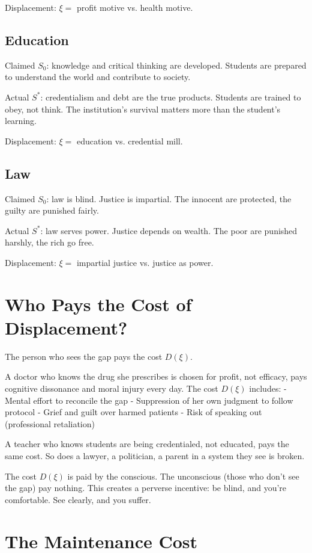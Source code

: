 \documentclass[12pt]{article}
\begin{document}
Displacement: $\xi = $ profit motive vs. health motive.

\subsection{Education}

Claimed $S_0$: knowledge and critical thinking are developed. Students are prepared to understand the world and contribute to society.

Actual $S^*$: credentialism and debt are the true products. Students are trained to obey, not think. The institution's survival matters more than the student's learning.

Displacement: $\xi = $ education vs. credential mill.

\subsection{Law}

Claimed $S_0$: law is blind. Justice is impartial. The innocent are protected, the guilty are punished fairly.

Actual $S^*$: law serves power. Justice depends on wealth. The poor are punished harshly, the rich go free.

Displacement: $\xi = $ impartial justice vs. justice as power.

\section{Who Pays the Cost of Displacement?}

The person who sees the gap pays the cost $D(\xi)$.

A doctor who knows the drug she prescribes is chosen for profit, not efficacy, pays cognitive dissonance and moral injury every day. The cost $D(\xi)$ includes:
- Mental effort to reconcile the gap
- Suppression of her own judgment to follow protocol
- Grief and guilt over harmed patients
- Risk of speaking out (professional retaliation)

A teacher who knows students are being credentialed, not educated, pays the same cost. So does a lawyer, a politician, a parent in a system they see is broken.

The cost $D(\xi)$ is paid by the conscious. The unconscious (those who don't see the gap) pay nothing. This creates a perverse incentive: be blind, and you're comfortable. See clearly, and you suffer.

\section{The Maintenance Cost}
\end{document}
